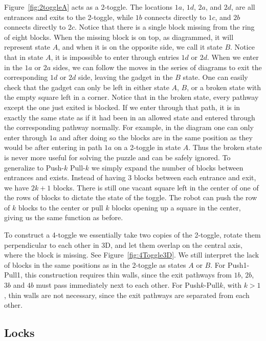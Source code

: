 Figure~\ref{fig:2toggleA} acts as a 2-toggle. The locations $1a$, $1d$, $2a$, and $2d$, are all entrances and exits to the 2-toggle, while $1b$ connects directly to $1c$, and $2b$ connects directly to $2c$. Notice that there is a single block missing from the ring of eight blocks. When the missing block is on top, as diagrammed, it will represent state $A$, and when it is on the opposite side, we call it state $B$. Notice that in state $A$, it is impossible to enter through entries $1d$ or $2d$. When we enter in the $1a$ or $2a$ sides, we can follow the moves in the series of diagrams to exit the corresponding $1d$ or $2d$ side, leaving the gadget in the $B$ state. One can easily check that the gadget can only be left in either state $A$, $B$, or a broken state with the empty square left in a corner. Notice that in the broken state, every pathway except the one just exited is blocked. If we enter through that path, it is in exactly the same state as if it had been in an allowed state and entered through the corresponding pathway normally. For example, in the diagram one can only enter through $1a$ and after doing so the blocks are in the same position as they would be after entering in path $1a$ on a 2-toggle in state $A$. Thus the broken state is never more useful for solving the puzzle and can be safely ignored. To generalize to Push-$k$ Pull-$k$ we simply expand the number of blocks between entrances and exists. Instead of having $3$ blocks between each entrance and exit, we have $2k+1$ blocks. There is still one vacant square left in the center of one of the rows of blocks to dictate the state of the toggle. The robot can push the row of $k$ blocks to the center or pull $k$ blocks opening up a square in the center, giving us the same function as before.

To construct a 4-toggle we essentially take two copies of the 2-toggle, rotate them perpendicular to each other in 3D, and let them overlap on the central axis, where the block is missing. See Figure~\ref{fig:4Toggle3D}. We still interpret the lack of blocks in the same positions as in the 2-toggle as states $A$ or $B$. %
For Push1-Pull1, this construction requires thin walls, since the exit pathways from $1b$, $2b$, $3b$ and $4b$ must pass immediately next to each other. For Push$k$-Pull$k$, with $k > 1$, thin walls are not necessary, since the exit pathways are separated from each other.
\subsection{Locks}

